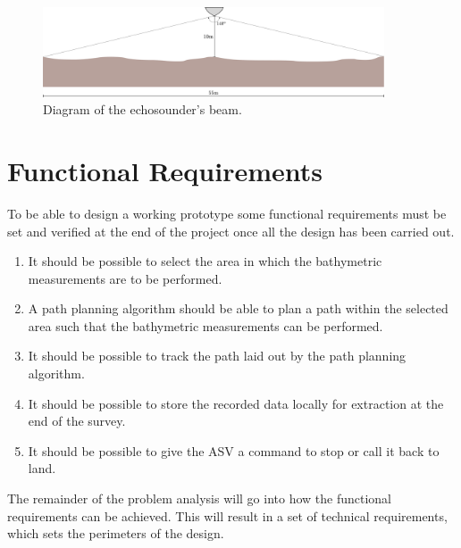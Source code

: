 \begin{figure}[H]
    \includegraphics[width=0.9\textwidth]{figures/echosounder}
    \caption{Diagram of the echosounder's beam.}
    \label{fig:echosounder}
\end{figure}

\section{Functional Requirements} \label{sec:requirements}
To be able to design a working prototype some functional requirements must be set and verified at the end of the project once all the design has been carried out.
%
\begin{enumerate}
  \item It should be possible to select the area in which the bathymetric measurements are to be performed.
  \item A path planning algorithm should be able to plan a path within the selected area such that the bathymetric measurements can be performed.
  \item It should be possible to track the path laid out by the path planning algorithm.
  \item It should be possible to store the recorded data locally for extraction at the end of the survey.
  \item It should be possible to give the ASV a command to stop or call it back to land.
\end{enumerate}
%
The remainder of the problem analysis will go into how the functional requirements can be achieved. This will result in a set of technical requirements, which sets the perimeters of the design.







